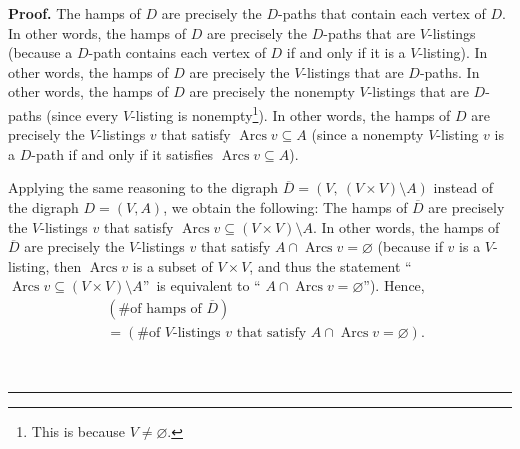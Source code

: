 \documentclass[numbers=enddot,12pt,final,onecolumn,notitlepage]{scrartcl}%
\numberwithin{exer}{section}
\theoremstyle{definition}
\newenvironment{proof}[1][Proof]{\noindent\textbf{#1.} }{\ \rule{0.5em}{0.5em}}
\newenvironment{verlong}{}{}
\begin{document}
\begin{verlong}


\begin{proof}
The hamps of $D$ are precisely the $D$-paths that contain each vertex of $D$.
In other words, the hamps of $D$ are precisely the $D$-paths that are
$V$-listings (because a $D$-path contains each vertex of $D$ if and only if it
is a $V$-listing). In other words, the hamps of $D$ are precisely the
$V$-listings that are $D$-paths. In other words, the hamps of $D$ are
precisely the nonempty $V$-listings that are $D$-paths (since every
$V$-listing is nonempty\footnote{This is because $V\neq\varnothing$.}). In
other words, the hamps of $D$ are precisely the $V$-listings $v$ that satisfy
$\operatorname*{Arcs}v\subseteq A$ (since a nonempty $V$-listing $v$ is a
$D$-path if and only if it satisfies $\operatorname*{Arcs}v\subseteq A$).

Applying the same reasoning to the digraph $\overline{D}=\left(  V,\ \left(
V\times V\right)  \setminus A\right)  $ instead of the digraph $D=\left(
V,A\right)  $, we obtain the following: The hamps of $\overline{D}$ are
precisely the $V$-listings $v$ that satisfy $\operatorname*{Arcs}%
v\subseteq\left(  V\times V\right)  \setminus A$. In other words, the hamps of
$\overline{D}$ are precisely the $V$-listings $v$ that satisfy $A\cap
\operatorname*{Arcs}v=\varnothing$ (because if $v$ is a $V$-listing, then
$\operatorname*{Arcs}v$ is a subset of $V\times V$, and thus the statement
\textquotedblleft$\operatorname*{Arcs}v\subseteq\left(  V\times V\right)
\setminus A$\textquotedblright\ is equivalent to \textquotedblleft%
$A\cap\operatorname*{Arcs}v=\varnothing$\textquotedblright). Hence,%
\begin{align}
&  \left(  \text{\# of hamps of }\overline{D}\right) \nonumber\\
&  =\left(  \text{\# of }V\text{-listings }v\text{ that satisfy }%
A\cap\operatorname*{Arcs}v=\varnothing\right)  . \label{pf.lem.hamps-by-lin.1}%
\end{align}



\end{proof}
\end{verlong}
\end{document}
